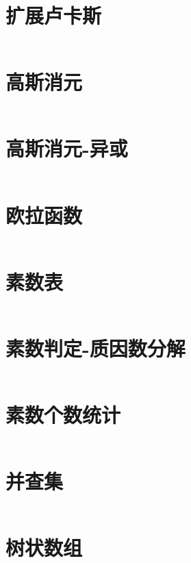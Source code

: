 \documentclass[titlepage,landscape,a4paper,10pt]{article}
\begin{document}
\begin{multicols}{2}
\begin{spacing}{0.8}
\section{扩展卢卡斯}
\inputminted{cpp}{/Users/Corn/Desktop/Code/ACM_SCL/code/ext_lucas.cpp}

\section{高斯消元}
\inputminted{cpp}{/Users/Corn/Desktop/Code/ACM_SCL/code/Gauss.cpp}

\section{高斯消元-异或}
\inputminted{cpp}{/Users/Corn/Desktop/Code/ACM_SCL/code/Gauss_xor.cpp}

\section{欧拉函数}
\inputminted{cpp}{/Users/Corn/Desktop/Code/ACM_SCL/code/eular_phi.cpp}

\section{素数表}
\inputminted{cpp}{/Users/Corn/Desktop/Code/ACM_SCL/code/primetable.cpp}

\section{素数判定-质因数分解}
\inputminted{cpp}{/Users/Corn/Desktop/Code/ACM_SCL/code/MillerRabin_PollardRho.cpp}

\section{素数个数统计}
\inputminted{cpp}{/Users/Corn/Desktop/Code/ACM_SCL/code/prime_cnt.cpp}

\section{并查集}
\inputminted{cpp}{/Users/Corn/Desktop/Code/ACM_SCL/code/uni_find.cpp}

\section{树状数组}
\inputminted{cpp}{/Users/Corn/Desktop/Code/ACM_SCL/code/BIT.cpp}


\end{spacing}
\end{multicols}
\end{document}
